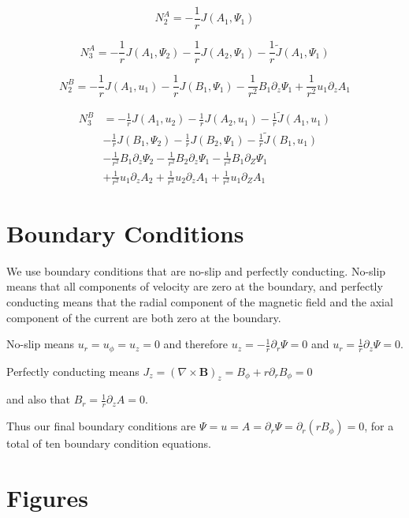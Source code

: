 \documentclass{paper}
\newcommand{\beq}{\begin{equation}}
\newcommand{\eeq}{\end{equation}}
\begin{document}
\beq
N_2^A = -\frac{1}{r} J\left(A_1, \Psi_1\right)
\eeq

\beq
N_3^A = -\frac{1}{r} J\left(A_1, \Psi_2\right) - \frac{1}{r}J\left(A_2, \Psi_1\right) - \frac{1}{r} \widetilde{J}\left(A_1, \Psi_1\right)
\eeq

\beq
N_2^B = -\frac{1}{r} J\left(A_1, u_1\right) - \frac{1}{r} J\left(B_1, \Psi_1\right) - \frac{1}{r^2} B_1 \partial_z \Psi_1 + \frac{1}{r^2} u_1 \partial_z A_1
\eeq

\beq
\begin{split}
N_3^B & = - \frac{1}{r} J\left(A_1, u_2\right) - \frac{1}{r} J\left(A_2, u_1\right) - \frac{1}{r}\widetilde{J}\left(A_1, u_1\right) \\
& - \frac{1}{r} J\left(B_1, \Psi_2\right) - \frac{1}{r} J\left(B_2, \Psi_1\right) - \frac{1}{r} \widetilde{J} \left(B_1, u_1\right) \\
& - \frac{1}{r^2} B_1\partial_z \Psi_2 - \frac{1}{r^2} B_2 \partial_z \Psi_1 - \frac{1}{r^2} B_1 \partial_Z \Psi_1 \\
& + \frac{1}{r^2} u_1 \partial_z A_2 + \frac{1}{r^2} u_2 \partial_z A_1 + \frac{1}{r^2} u_1 \partial_Z A_1
\end{split}
\eeq

\section{Boundary Conditions}

We use boundary conditions that are no-slip and perfectly conducting. No-slip means that all components of velocity are zero at the boundary, and perfectly conducting means that the radial component of the magnetic field and the axial component of the current are both zero at the boundary. 

No-slip means $u_r = u_\phi = u_z = 0$ and therefore $u_z = - \frac{1}{r}\partial_r \Psi = 0$ and $u_r = \frac{1}{r}\partial_z \Psi = 0$. 

Perfectly conducting means $J_z = (\nabla \times \mathbf{B})_z = B_\phi + r\partial_r B_\phi = 0$

and also that $B_r = \frac{1}{r}\partial_z A = 0$.

Thus our final boundary conditions are $\Psi = u = A = \partial_r \Psi = \partial_r(r B_\phi) = 0$, for a total of ten boundary condition equations.

\section{Figures}
\end{document}
